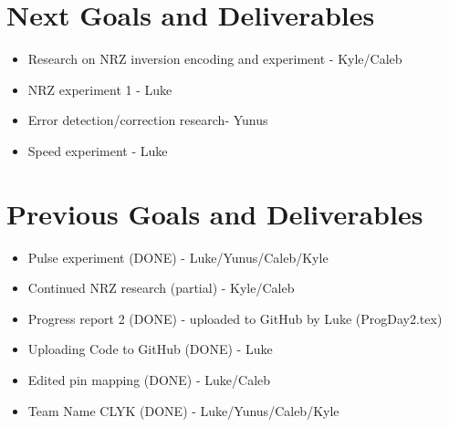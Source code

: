 \documentclass{article}
\begin{document}
\section*{Next Goals and Deliverables}
\begin{itemize}
\item Research on NRZ inversion encoding and experiment - Kyle/Caleb
\item NRZ experiment 1 - Luke
\item Error detection/correction research- Yunus
\item Speed experiment - Luke
\end{itemize}
\section*{Previous Goals and Deliverables}
\begin{itemize}
\item Pulse experiment (DONE) - Luke/Yunus/Caleb/Kyle 
\item Continued NRZ research (partial) - Kyle/Caleb
\item Progress report 2 (DONE) - uploaded to GitHub by Luke (ProgDay2.tex)
\item Uploading Code to GitHub (DONE) - Luke 
\item Edited pin mapping (DONE) - Luke/Caleb
\item Team Name CLYK (DONE) - Luke/Yunus/Caleb/Kyle 
\end{itemize}
\end{document}

